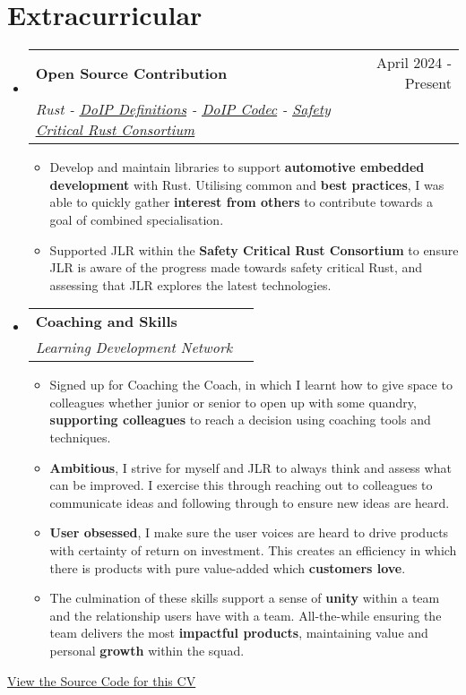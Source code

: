 \documentclass[letterpaper,11pt]{article}
\makeatletter
\newcommand{\resumeItem}[1]{
  \item\small{
    {#1 \vspace{-2pt}}
  }
}
\newcommand{\resumeSubheading}[4]{
  \vspace{-2pt}\item
    \begin{tabular*}{0.97\textwidth}[t]{l@{\extracolsep{\fill}}r}
      \textbf{#1} & #2 \\
      \textit{\small#3} & \textit{\small #4} \\
    \end{tabular*}\vspace{-7pt}
}
\newcommand{\resumeSubHeadingListStart}{\begin{itemize}[leftmargin=0.15in, label={}]}
\newcommand{\resumeSubHeadingListEnd}{\end{itemize}}
\newcommand{\resumeItemListStart}{\begin{itemize}}
\newcommand{\resumeItemListEnd}{\end{itemize}\vspace{-5pt}}
\makeatother
\begin{document}
\section{Extracurricular}
  \resumeSubHeadingListStart
    \resumeSubheading
      {Open Source Contribution}{April 2024 - Present}
      {Rust - \href{https://crates.io/crates/doip-definitions}{\underline{DoIP Definitions}} - \href{https://crates.io/crates/doip-codec}{\underline{DoIP Codec}} - \href{https://github.com/rustfoundation/safety-critical-rust-consortium}{\underline{Safety Critical Rust Consortium}}}{}
      \resumeItemListStart
      \resumeItem{Develop and maintain libraries to support \textbf{automotive embedded development} with Rust. Utilising common and \textbf{best practices}, I was able to quickly gather \textbf{interest from others} to contribute towards a goal of combined specialisation.}
      \resumeItem{Supported JLR within the \textbf{Safety Critical Rust Consortium} to ensure JLR is aware of the progress made towards safety critical Rust, and assessing that JLR explores the latest technologies.}
      \resumeItemListEnd

    \resumeSubheading
      {Coaching and Skills}{}
      {Learning Development Network}{}
      \resumeItemListStart
      \resumeItem{Signed up for Coaching the Coach, in which I learnt how to give space to colleagues whether junior or senior to open up with some quandry, \textbf{supporting colleagues} to reach a decision using coaching tools and techniques.}
      \resumeItem{\textbf{Ambitious}, I strive for myself and JLR to always think and assess what can be improved. I exercise this through reaching out to colleagues to communicate ideas and following through to ensure new ideas are heard.}
      \resumeItem{\textbf{User obsessed}, I make sure the user voices are heard to drive products with certainty of return on investment. This creates an efficiency in which there is products with pure value-added which \textbf{customers love}.}
      \resumeItem{The culmination of these skills support a sense of  \textbf{unity} within a team and the relationship users have with a team. All-the-while ensuring the team delivers the most  \textbf{impactful products}, maintaining value and personal \textbf{growth} within the squad.}
      \resumeItemListEnd
  \resumeSubHeadingListEnd
\href{https://github.com/samp-reston/resume}{\small\underline{View the Source Code for this CV}} \\
\end{document}
